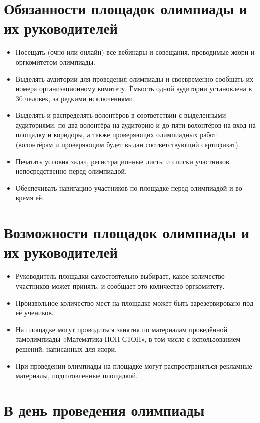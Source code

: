 \documentclass[a4paper,12pt]{article}
\newcommand{\mns}{«Математика НОН-СТОП»\xspace}
\begin{document}
\section{Обязанности площадок олимпиады и их руководителей}

\begin{itemize}
	\item Посещать (очно или онлайн) все вебинары и совещания, проводимые жюри и оргкомитетом олимпиады.
	\item Выделять аудитории для проведения олимпиады и своевременно сообщать их номера организационному комитету. Ёмкость одной аудитории установлена в 30 человек, за редкими исключениями.
	\item Выделять и распределять волонтёров в соответствии с выделенными аудиториями: по два волонтёра на аудиторию и до пяти волонтёров на вход на площадку и коридоры, а также проверяющих олимпиадных работ (волонтёрам и проверяющим будет выдан соответствующий сертификат).
	\item Печатать условия задач, регистрационные листы и списки участников непосредственно перед олимпиадой.
	\item Обеспечивать навигацию участников по площадке перед олимпиадой и во время её.
\end{itemize}

\section{Возможности площадок олимпиады и их руководителей}

\begin{itemize}
	\item Руководитель площадки самостоятельно выбирает, какое количество участников может принять, и сообщает это количество оргкомитету.
	\item Произвольное количество мест на площадке может быть зарезервировано под её учеников.
	\item На площадке могут проводиться занятия по материалам проведённой там\linebreak олимпиады \mns, в том числе с использованием решений, написанных для жюри.
	\item При проведении олимпиады на площадке могут распространяться рекламные материалы, подготовленные площадкой.
\end{itemize}

\section{В день проведения олимпиады}
\end{document}
